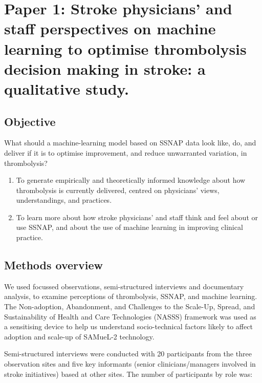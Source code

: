 \section{Paper 1: Stroke physicians' and staff perspectives on machine learning to optimise thrombolysis decision making in stroke: a qualitative study. \cite{jarvie_stroke_2024}}\label{sec:paper_1}

\subsection{Objective}

What should a machine-learning model based on SSNAP data look like, do, and deliver if it is to optimise improvement, and reduce unwarranted variation, in thrombolysis?

\begin{enumerate}
    \item To generate empirically and theoretically informed knowledge about how thrombolysis is currently delivered, centred on physicians’ views, understandings, and practices.
    \item To learn more about how stroke physicians’ and staff think and feel about or use SSNAP, and about the use of machine learning in improving clinical practice.
\end{enumerate}

\subsection{Methods overview}

We used focussed observations, semi-structured interviews and documentary analysis, to examine perceptions of thrombolysis, SSNAP, and machine learning. The Non-adoption, Abandonment, and Challenges to the Scale-Up, Spread, and Sustainability of Health and Care Technologies (NASSS) framework \cite{greenhalgh_beyond_2017} was used as a sensitising device to help us understand socio-technical factors likely to affect adoption and scale-up of SAMueL-2 technology.

Semi-structured interviews were conducted with 20 participants from the three observation sites and five key informants (senior clinicians/managers involved in stroke initiatives) based at other sites. The number of participants by role was:

